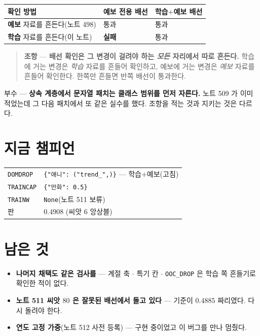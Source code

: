 \documentclass[11pt]{article}
\begin{document}
\begin{center}
\begin{tabular}{lll}
\hline
확인 방법 & 예보 전용 배선 & 학습$+$예보 배선 \\
\hline
\textbf{예보} 자료를 흔든다(노트 498) & 통과 & 통과 \\
\textbf{학습} 자료를 흔든다(이 노트) & \textbf{실패} & 통과 \\
\hline
\end{tabular}
\end{center}

\begin{quote}
\textbf{조항} --- \textbf{배선 확인은 그 변경이 걸려야 하는 \emph{모든}
자리에서 따로 흔든다.} 학습에 거는 변경은 \emph{학습} 자료를 흔들어
확인하고, 예보에 거는 변경은 \emph{예보} 자료를 흔들어 확인한다. 한쪽만
흔들면 반쪽 배선이 통과한다.
\end{quote}

부수 --- \textbf{상속 계층에서 문자열 패치는 클래스 범위를 먼저 자른다.}
노트 509 가 이미 적었는데 그 다음 패치에서 또 같은 실수를 했다. 조항을
적는 것과 지키는 것은 다르다.

\section{지금 챔피언}

\begin{center}
\begin{tabular}{ll}
\hline
\texttt{DOMDROP} & \texttt{\{"애니": ("trend\_",)\}} --- 학습$+$예보(고침) \\
\texttt{TRAINCAP} & \texttt{\{"만화": 0.5\}} \\
\texttt{TRAINW} & \texttt{None}(노트 511 보류) \\
\hline
판 & $\mathbf{0.4908}$ (씨앗 $6$ 앙상블) \\
\hline
\end{tabular}
\end{center}

\section*{남은 것}

\begin{itemize}
\item \textbf{나머지 채택도 같은 검사를} --- 계절 축 $\cdot$ 특기 칸 $\cdot$
\texttt{OOC\_DROP} 은 학습 쪽 흔들기로 확인한 적이 없다.
\item \textbf{노트 511 씨앗 $80$ 은 잘못된 배선에서 돌고 있다} --- 기준이
$0.4885$ 짜리였다. 다시 돌려야 한다.
\item \textbf{연도 고정 가중}(노트 512 사전 등록) --- 구현 중이었고 이
버그를 만나 멈췄다.
\end{itemize}
\end{document}
